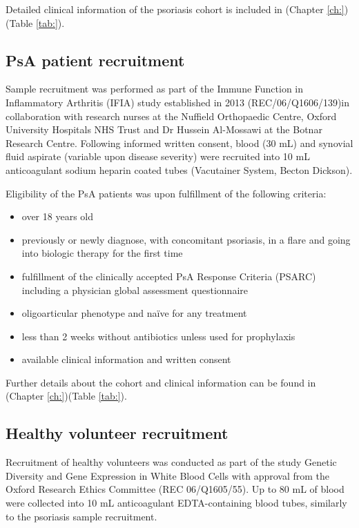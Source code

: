 Detailed clinical information of the psoriasis cohort is included in (Chapter \ref{ch:})(Table \ref{tab:}).

\subsection{PsA patient recruitment}
Sample recruitment was performed as part of the Immune Function in Inflammatory Arthritis (IFIA) study established in 2013 (REC/06/Q1606/139)in collaboration with research nurses at the Nuffield Orthopaedic Centre, Oxford University Hospitals NHS Trust and Dr Hussein Al-Mossawi at the Botnar Research Centre. Following informed written consent, blood (30 mL) and synovial fluid aspirate (variable upon disease severity) were recruited into 10 mL anticoagulant sodium heparin coated tubes (Vacutainer System, Becton Dickson).

Eligibility of the PsA patients was upon fulfillment of the following criteria:
\begin{itemize}
  \item over 18 years old
  \item previously or newly diagnose, with concomitant psoriasis, in a flare and going into biologic therapy for the first time %
	\item fulfillment of the clinically accepted PsA Response Criteria (PSARC) including a physician global assessment questionnaire \parencite{Philipp2011,Clegg1996}
	\item oligoarticular phenotype and na\"{i}ve for any treatment
	\item less than 2 weeks without antibiotics unless used for prophylaxis %
	\item available clinical information and written consent
\end{itemize}

Further details about the cohort and clinical information can be found in (Chapter \ref{ch:})(Table \ref{tab:}).

\subsection{Healthy volunteer recruitment}
Recruitment of healthy volunteers was conducted as part of the study Genetic Diversity and Gene Expression in White Blood Cells with approval from the Oxford Research Ethics Committee (REC 06/Q1605/55). Up to 80 mL of blood were collected into 10 mL anticoagulant EDTA-containing blood tubes, similarly to the psoriasis sample recruitment.

